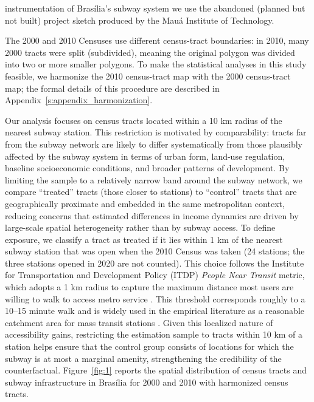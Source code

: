 instrumentation of Brasília's subway system we use the abandoned (planned but not built) project sketch produced by the Mauá Institute of Technology.

The 2000 and 2010 Censuses use different census-tract boundaries: in 2010, many 2000 tracts were split (subdivided), meaning the original polygon was divided into two or more smaller polygons. To make the statistical analyses in this study feasible, we harmonize the 2010 census-tract map with the 2000 census-tract map; the formal details of this procedure are described in Appendix~\ref{s:appendix_harmonization}.

Our analysis focuses on census tracts located within a 10 km radius of the nearest subway station. This restriction is motivated by comparability: tracts far from the subway network are likely to differ systematically from those plausibly affected by the subway system in terms of urban form, land-use regulation, baseline socioeconomic conditions, and broader patterns of development. By limiting the sample to a relatively narrow band around the subway network, we compare ``treated'' tracts (those closer to stations) to ``control'' tracts that are geographically proximate and embedded in the same metropolitan context, reducing concerns that estimated differences in income dynamics are driven by large-scale spatial heterogeneity rather than by subway access. To define exposure, we classify a tract as treated if it lies within 1 km of the nearest subway station that was open when the 2010 Census was taken (24 stations; the three stations opened in 2020 are not counted). This choice follows the Institute for Transportation and Development Policy (ITDP) \emph{People Near Transit} metric, which adopts a 1 km radius to capture the maximum distance most users are willing to walk to access metro service \citep{marks2016people}. This threshold corresponds roughly to a 10--15 minute walk and is widely used in the empirical literature as a reasonable catchment area for mass transit stations \citep{iamtrakul2024exploring, yang2024does, mohammad2017effect}. Given this localized nature of accessibility gains, restricting the estimation sample to tracts within 10 km of a station helps ensure that the control group consists of locations for which the subway is at most a marginal amenity, strengthening the credibility of the counterfactual. Figure~\ref{fig:1} reports the spatial distribution of census tracts and subway infrastructure in Brasília for 2000 and 2010 with harmonized census tracts.


